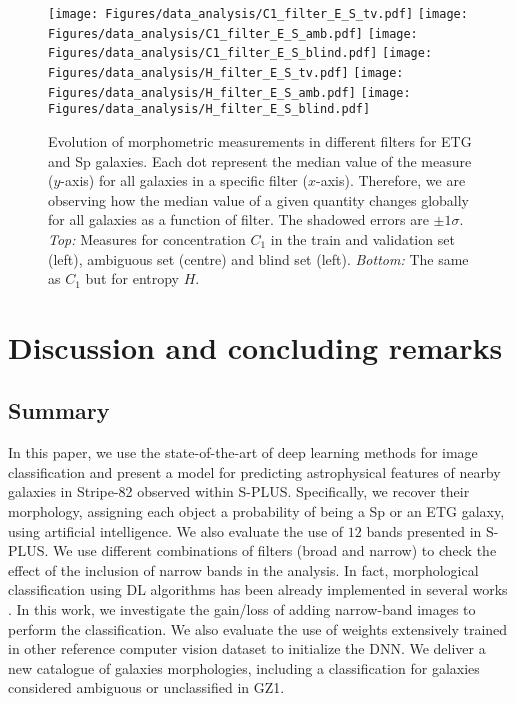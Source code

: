 \documentclass[fleqn,usenatbib]{mnras}
\begin{document}
\begin{figure*}
\centering
\texttt{[image: Figures/data\_analysis/C1\_filter\_E\_S\_tv.pdf]}
\texttt{[image: Figures/data\_analysis/C1\_filter\_E\_S\_amb.pdf]}
\texttt{[image: Figures/data\_analysis/C1\_filter\_E\_S\_blind.pdf]}
\texttt{[image: Figures/data\_analysis/H\_filter\_E\_S\_tv.pdf]}
\texttt{[image: Figures/data\_analysis/H\_filter\_E\_S\_amb.pdf]}
\texttt{[image: Figures/data\_analysis/H\_filter\_E\_S\_blind.pdf]}
    \caption{
    \label{fig:evo_C_H} 
    Evolution of morphometric measurements in different filters for ETG and Sp galaxies. Each dot represent the median value of the measure ($y$-axis) for all galaxies in a specific filter ($x$-axis). Therefore, we are observing how the median value of a given quantity changes globally for all galaxies as a function of filter. The shadowed errors are $\pm 1\sigma$.
    \emph{Top:} Measures for concentration $C_1$ in the train and validation set (left), ambiguous set (centre) and blind set (left). 
    \emph{Bottom:} The same as $C_1$ but for entropy $H$.
    }
\end{figure*}




\section{Discussion and concluding remarks}
\label{sec:discussion}

\subsection{Summary}
In this paper, we use the state-of-the-art of deep learning methods for image classification and present a model for predicting astrophysical features of nearby galaxies in Stripe-82 observed within S-PLUS. Specifically, we recover their morphology, assigning each object a probability of being a Sp or an ETG galaxy, using artificial intelligence. 
We also evaluate the use of $12$ bands presented in S-PLUS. We use different combinations of filters (broad and narrow) to check the effect of the inclusion of narrow bands in the analysis. In fact, morphological classification using DL algorithms has been already implemented in several works \citep{Dominguez2018, Barchi2020,tuccillo2016deep,khalifa2018deep,dieleman2015rotation,zhu2019galaxy,dai2018galaxy,Gupta2020,Vega-Ferrero2020}. In this work, we investigate the gain/loss of adding narrow-band images to perform the classification.  We also evaluate the use of weights extensively trained in other reference computer vision dataset to initialize the DNN. 
We deliver a new catalogue of galaxies morphologies, including a classification for galaxies considered ambiguous or unclassified in GZ1.  
\end{document}
